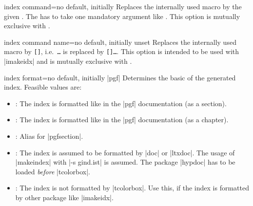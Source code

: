 \begin{docTcbKey}[][doc new=2015-01-09]{index command}{=}{no default, initially }
  Replaces the internally used  macro by the given .
  The  has to take one mandatory argument like .
  This option is mutually exclusive with .
\begin{dispListing}
\end{dispListing}
\end{docTcbKey}


\begin{docTcbKey}[][doc new=2015-01-09]{index command name}{=}{no default, initially unset}
  Replaces the internally used  macro by
  \mbox{\texttt{[]}}, i.e.\ 
  \mbox{\texttt{\textbraceleft\ldots\textbraceright}} is replaced by
  \mbox{\cs{index}\texttt{[\meta{name}]\textbraceleft\ldots\textbraceright}}.
  This option is intended to be used with |imakeidx| and is
  mutually exclusive with .
\begin{dispListing}
\end{dispListing}
\end{docTcbKey}



\begin{docTcbKey}{index format}{=}{no default, initially |pgf|}
  Determines the basic \meta{format} of the generated index.
  Feasible values are:
  \begin{itemize}
  \item{}: The index is formatted like in the |pgf| documentation (as a section).
  \item\docValue{pgfchapter}: The index is formatted like in the |pgf| documentation (as a chapter).
  \item\docValue{pgf}: Alias for |pgfsection|.
  \item{}: The index is assumed to be formatted by |doc| or |ltxdoc|. The usage of |makeindex|
    with |-s gind.ist| is assumed. The package |hypdoc| has to be loaded
    \emph{before} |tcolorbox|.
  \item{}: The index is not formatted by |tcolorbox|. Use this, if
    the index is formatted by other package like |imakeidx|.
  \end{itemize}
\end{docTcbKey}


